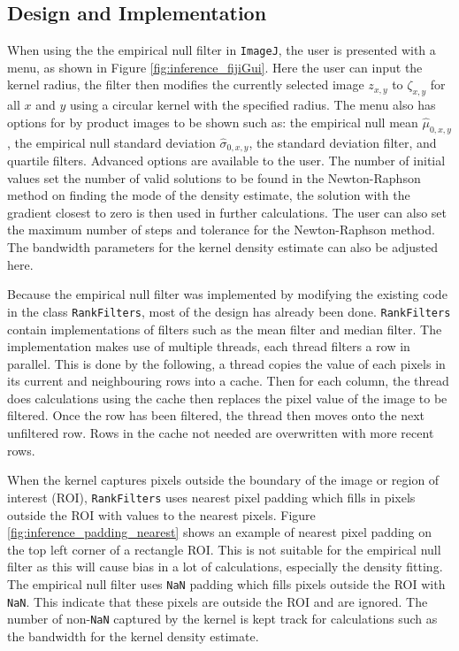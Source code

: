 \subsection{Design and Implementation}

When using the the empirical null filter in \texttt{ImageJ}, the user is presented with a menu, as shown in Figure \ref{fig:inference_fijiGui}. Here the user can input the kernel radius, the filter then modifies the currently selected image $z_{x,y}$ to $\zeta_{x,y}$ for all $x$ and $y$ using a circular kernel with the specified radius. The menu also has options for by product images to be shown such as: the empirical null mean $\widehat{\mu}_{0,x,y}$, the empirical null standard deviation $\widehat{\sigma}_{0,x,y}$, the standard deviation filter, and quartile filters. Advanced options are available to the user. The number of initial values set the number of valid solutions to be found in the Newton-Raphson method on finding the mode of the density estimate, the solution with the gradient closest to zero is then used in further calculations. The user can also set the maximum number of steps and tolerance for the Newton-Raphson method. The bandwidth parameters for the kernel density estimate can also be adjusted here.

Because the empirical null filter was implemented by modifying the existing code in the class \texttt{RankFilters}, most of the design has already been done. \texttt{RankFilters} contain implementations of filters such as the mean filter and median filter. The implementation makes use of multiple threads, each thread filters a row in parallel. This is done by the following, a thread copies the value of each pixels in its current and neighbouring rows into a cache. Then for each column, the thread does calculations using the cache then replaces the pixel value of the image to be filtered. Once the row has been filtered, the thread then moves onto the next unfiltered row. Rows in the cache not needed are overwritten with more recent rows.

When the kernel captures pixels outside the boundary of the image or region of interest (ROI), \texttt{RankFilters} uses nearest pixel padding which fills in pixels outside the ROI with values to the nearest pixels. Figure \ref{fig:inference_padding_nearest} shows an example of nearest pixel padding on the top left corner of a rectangle ROI. This is not suitable for the empirical null filter as this will cause bias in a lot of calculations, especially the density fitting. The empirical null filter uses \texttt{NaN} padding which fills pixels outside the ROI with \texttt{NaN}. This indicate that these pixels are outside the ROI and are ignored. The number of non-\texttt{NaN} captured by the kernel is kept track for calculations such as the bandwidth for the kernel density estimate.

